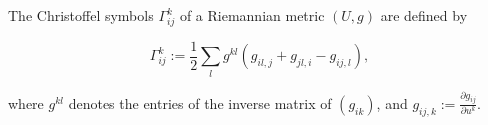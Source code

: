 The Christoffel symbols $\Gamma_{ij}^k$ of a Riemannian metric $(U, g)$ are defined by

$$\Gamma_{ij}^k := \frac{1}{2} \sum_{l} g^{kl} \left( g_{il,j} + g_{jl,i} - g_{ij,l} \right),$$

where $g^{kl}$ denotes the entries of the inverse matrix of $(g_{ik})$, and $g_{ij,k} := \frac{\partial g_{ij}}{\partial u^k}$.
